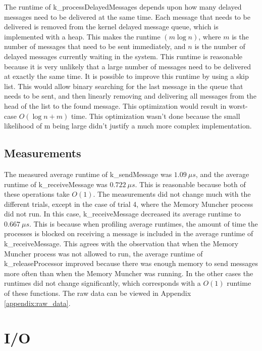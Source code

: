 \documentclass[12pt]{report}
\begin{document}
    The runtime of k\_processDelayedMessages depends upon how many delayed
    messages  need to be delivered at the same time. Each message that needs to
    be delivered  is removed from the kernel delayed message queue, which is
    implemented  with a heap. This makes  the runtime $(m \log n)$, where $m$ is
    the number of messages that need to be sent immediately, and $n$ is the
    number of delayed messages currently waiting in the system. This runtime is
    reasonable because it is very unlikely that a large number of messages need
    to be delivered at exactly the same time. It is possible to improve this
    runtime by using a skip list. This would allow binary searching for the last
    message in the queue that needs to be sent, and then linearly removing and
    delivering all messages  from the head of the list to the found message.
    This optimization would result  in worst-case $O(\log n + m)$ time. This
    optimization wasn't done because the  small likelihood of m being large
    didn't justify a much more complex implementation.

\section{Measurements}

    The measured average runtime of k\_sendMessage was $1.09 \: \mu s$, and the average
    runtime of k\_receiveMessage was $0.722 \: \mu s$. This is reasonable because both
    of these operations take $O(1)$. The measurements did not change much with the
    different trials, except in the case of trial 4, where the Memory Muncher process
    did not run. In this case, k\_receiveMessage decreased its average runtime to
    $0.667 \: \mu s$. This is because when profiling average runtimes, the amount of
    time the processes is blocked on receiving a message is included in the average runtime
    of k\_receiveMessage. This agrees with the observation that when the Memory Muncher
    process was not allowed to run, the average runtime of k\_releaseProcessor improved
    because there was enough memory to send messages more often than when the Memory
    Muncher was running. In the other cases the runtimes did not change significantly,
    which corresponds with a $O(1)$ runtime of these functions. The raw data can
    be viewed in Appendix \ref{appendix:raw_data}.

\chapter{I/O}
\end{document}
